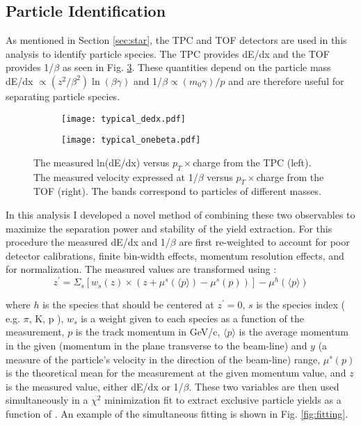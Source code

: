 	\subsection{Particle Identification}
	\label{sec:pid}
	As mentioned in Section \ref{sec:star}, the TPC and TOF detectors are used in this analysis to identify particle species. The TPC provides dE/dx  and the TOF provides 1/$\beta$ as seen in Fig. \ref{fig:typical_pid}. These quantities depend on the particle mass dE/dx $\propto (z^2/\beta^2) \ln(\beta \gamma)$ and 1/$\beta \propto (m_0 \gamma) / p $ and are therefore useful for separating particle species. 

	\begin{figure}
		\centering 
		\begin{subfigure}[b]{0.49\textwidth} 
			\texttt{[image: typical\_dedx.pdf]} 
			\label{fig:typical_dEdx} 
		\end{subfigure} 
		\begin{subfigure}[b]{0.49\textwidth} 
			\texttt{[image: typical\_onebeta.pdf]} 
			\label{fig:typical_onebeta} 
		\end{subfigure}
		\caption{ \label{fig:typical_pid} The measured ln(dE/dx) versus $p_T \times $charge from the TPC (left). The measured velocity expressed at 1/$\beta$ versus $p_T \times$charge from the TOF (right). The bands correspond to particles of different masses. } 
	\end{figure}

	In this analysis I developed a novel method of combining these two observables to maximize the separation power and stability of the yield extraction. For this procedure the measured dE/dx and 1/$\beta$ are first re-weighted to account for poor detector calibrations, finite bin-width effects, momentum resolution effects, and for normalization. The measured values are transformed using :
	\begin{equation}
		z^{\prime} = \Sigma_{s} \left[ w_{s}(z) \times \left( z + \mu^{s}(\langle p \rangle ) - \mu^{s}(p) \right) \right] - \mu^{h}(\langle p \rangle)
	\end{equation}

	where $h$ is the species that should be centered at $z^{\prime} = 0$, $s$ is the species index ( e.g. $\pi$, K, p ), $w_{s}$ is a weight given to each species as a function of the measurement, $p$ is the track momentum in GeV/c, $\langle p \rangle$ is the average momentum in the given \pt (momentum in the plane transverse to the beam-line) and $y$ (a measure of the particle's velocity in the direction of the beam-line) range, $\mu^{s}(p)$ is the theoretical mean for the measurement at the given momentum value, and $z$ is the measured value, either dE/dx or 1/$\beta$. These two variables are then used simultaneously in a $\chi^2$ minimization fit to extract exclusive particle yields as a function of \pt. An example of the simultaneous fitting is shown in Fig. \ref{fig:fitting}.

